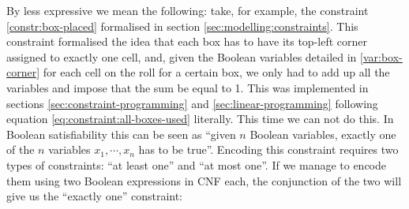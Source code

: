 By less expressive we mean the following: take, for example, the constraint
\ref{constr:box-placed} formalised in section \ref{sec:modelling:constraints}.
This constraint formalised the idea that each box has to have its
top-left corner assigned to exactly one cell, and, given the Boolean variables
detailed in \ref{var:box-corner} for each cell on the roll for a certain box, we
only had to add up all the variables and impose that the sum be equal to 1.
This was implemented in sections \ref{sec:constraint-programming} and
\ref{sec:linear-programming} following equation \ref{eq:constraint:all-boxes-used}
literally. This time we can not do this. In Boolean satisfiability this can be seen
as ``given $n$ Boolean variables, exactly one of the $n$ variables $x_1,\cdots,x_n$
has to be true''. Encoding this constraint requires two types of constraints:
``at least one'' and ``at most one''. If we manage to encode them using two Boolean
expressions in CNF each, the conjunction of the two will give us the ``exactly one''
constraint:
